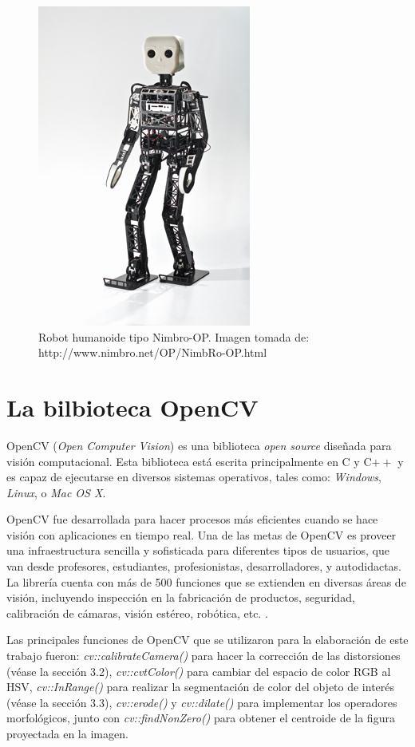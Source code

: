 \begin{figure}
\centering
\includegraphics[scale=2.0]{images/Nimbro-OP.jpg}
\caption{Robot humanoide tipo Nimbro-OP. Imagen tomada de: http://www.nimbro.net/OP/NimbRo-OP.html}
\label{fig:Nimbro-OP}
\end{figure} 
	
	\section{La bilbioteca OpenCV}
OpenCV (\textit{Open Computer Vision}) es una biblioteca \textit{open source} diseñada para visión computacional. Esta biblioteca está escrita principalmente en C y C$++$ y es capaz de ejecutarse en diversos sistemas operativos, tales como: \textit{Windows}, \textit{Linux}, o \textit{Mac OS X}.

OpenCV fue desarrollada para hacer procesos más eficientes cuando se hace visión con aplicaciones en tiempo real. Una de las metas de OpenCV es proveer una infraestructura sencilla y sofisticada para  diferentes tipos de usuarios, que van desde profesores, estudiantes, profesionistas, desarrolladores, y autodidactas. La librería cuenta con más de 500 funciones que se extienden en diversas áreas de visión, incluyendo inspección en la fabricación de productos, seguridad, calibración de cámaras, visión estéreo, robótica, etc. \citep{culjak2012brief}.

	Las principales funciones de OpenCV que se utilizaron para la elaboración de este trabajo fueron:  \textit{cv::calibrateCamera()} para hacer la corrección de las distorsiones (véase la sección 3.2), \textit{cv::cvtColor()} para cambiar del espacio de color RGB al HSV, \textit{cv::InRange()} para realizar la segmentación de color del objeto de interés (véase la sección 3.3), \textit{cv::erode()} y \textit{cv::dilate()} para implementar los operadores morfológicos, junto con \textit{cv::findNonZero()} para obtener el centroide de la figura proyectada en la imagen. 
	
